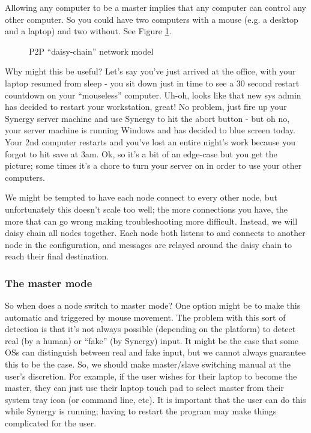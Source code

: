 

Allowing any computer to be a master implies that any computer can control
any other computer. So you could have two computers with a mouse (e.g. a 
desktop and a laptop) and two without. See Figure \ref{fig:p2p}.

\begin{figure}[ht!]
  \centering
  
  \caption{P2P ``daisy-chain'' network model}
  \label{fig:p2p}
\end{figure}

Why might this be useful? Let's say you've just arrived at the
office, with your laptop resumed from sleep - you sit down just in time to see
a 30 second restart countdown on your ``mouseless'' computer. Uh-oh, looks like
that new sys admin has decided to restart your workstation, great! No problem, 
just fire up your Synergy server machine and use Synergy to hit the abort 
button - but oh no, your server machine is running Windows and has decided to 
blue screen today. Your 2nd computer restarts and you've lost an entire night's
work because you forgot to hit save at 3am. Ok, so it's a bit of an edge-case
but you get the picture; some times it's a chore to turn your server on in
order to use your other computers.

We might be tempted to have each node connect to every other node, but
unfortunately this doesn't scale too well; the more connections you have, the
more that can go wrong making troubleshooting more difficult. Instead, we will
daisy chain all nodes together. Each node both listens to and connects to 
another node in the configuration, and messages are relayed around the daisy
chain to reach their final destination.

\subsubsection{The master mode}

So when does a node switch to master mode? One option might be to make this
automatic and triggered by mouse movement. The problem with this sort of
detection is that it's not always possible (depending on the platform) to
detect real (by a human) or ``fake'' (by Synergy) input. It might be the
case that some OSs can distinguish between real and fake input, but we cannot
always guarantee this to be the case. So, we should make master/slave switching
manual at the user's discretion. For example, if the user wishes for their
laptop to become the master, they can just use their laptop touch pad to
select master from their system tray icon (or command line, etc). It is
important that the user can do this while Synergy is running; having to restart
the program may make things complicated for the user.


